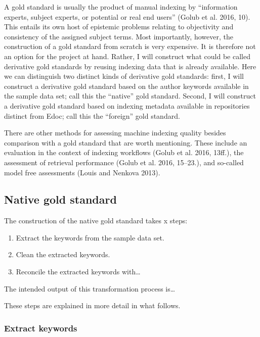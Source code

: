A gold standard is usually the product of manual indexing by
``information experts, subject experts, or potential or real end users''
(Golub et al. 2016, 10). This entails its own host of epistemic problems
relating to objectivity and consistency of the assigned subject terms.
Most importantly, however, the construction of a gold standard from
scratch is very expensive. It is therefore not an option for the project
at hand. Rather, I will construct what could be called derivative gold
standards by reusing indexing data that is already available. Here we
can distinguish two distinct kinds of derivative gold standards: first,
I will construct a derivative gold standard based on the author keywords
available in the sample data set; call this the ``native'' gold
standard. Second, I will construct a derivative gold standard based on
indexing metadata available in repositories distinct from Edoc; call
this the ``foreign'' gold standard.

There are other methods for assessing machine indexing quality besides
comparison with a gold standard that are worth mentioning. These include
an evaluation in the context of indexing workflows (Golub et al. 2016,
13ff.), the assessment of retrieval performance (Golub et al. 2016,
15--23.), and so-called model free assessments (Louis and Nenkova 2013).

\hypertarget{native-gold-standard}{%
\subsection{Native gold standard}\label{native-gold-standard}}

The construction of the native gold standard takes x steps:

\begin{enumerate}
\def\labelenumi{\arabic{enumi}.}
\tightlist
\item
  Extract the keywords from the sample data set.\\
\item
  Clean the extracted keywords.
\item
  Reconcile the extracted keywords with\ldots{}
\end{enumerate}

The intended output of this transformation process is\ldots{}

These steps are explained in more detail in what follows.

\hypertarget{extract-keywords}{%
\subsubsection{Extract keywords}\label{extract-keywords}}

